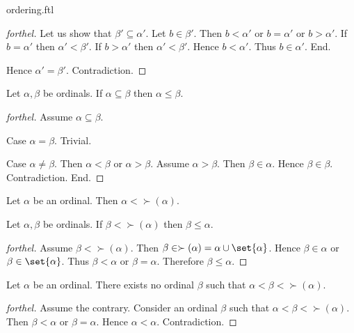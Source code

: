 \documentclass{naproche-library}
\begin{document}
\begin{smodule}{ordering.ftl}
\begin{proof}[forthel]
    Let us show that $\beta' \subseteq \alpha'$.
      Let $b \in \beta'$.
      Then $b < \alpha'$ or $b = \alpha'$ or $b > \alpha'$.
      If $b = \alpha'$ then $\alpha' < \beta'$.
      If $b > \alpha'$ then $\alpha' < \beta'$.
      Hence $b < \alpha'$.
      Thus $b \in \alpha'$.
    End.

    Hence $\alpha' = \beta'$.
    Contradiction.
  \end{proof}

  \begin{proposition}[forthel,id=SET_THEORY_02_610496856195072,printid]
    Let $\alpha, \beta$ be ordinals.
    If $\alpha \subseteq \beta$ then $\alpha \leq \beta$.
  \end{proposition}
  \begin{proof}[forthel]
    Assume $\alpha \subseteq \beta$.

    Case $\alpha = \beta$. Trivial.

    Case $\alpha \neq \beta$.
      Then $\alpha < \beta$ or $\alpha > \beta$.
      Assume $\alpha > \beta$.
      Then $\beta \in \alpha$.
      Hence $\beta \in \beta$.
      Contradiction.
    End.
  \end{proof}

  \begin{proposition}[forthel,id=SET_THEORY_02_5689190964527104,printid]
    Let $\alpha$ be an ordinal.
    Then $\alpha < \succ(\alpha)$.
  \end{proposition}

  \begin{proposition}[forthel,id=SET_THEORY_02_4064972025888768,printid]
    Let $\alpha, \beta$ be ordinals.
    If $\beta < \succ(\alpha)$ then $\beta \leq \alpha$.
  \end{proposition}
  \begin{proof}[forthel]
    Assume $\beta < \succ(\alpha)$.
    Then $\beta \in \succ(\alpha) = \alpha \cup \set{\alpha}$.
    Hence $\beta \in \alpha$ or $\beta \in \set{\alpha}$.
    Thus $\beta < \alpha$ or $\beta = \alpha$.
    Therefore $\beta \leq \alpha$.
  \end{proof}

  \begin{proposition}[forthel,id=SET_THEORY_02_8242798790705152,printid]
    Let $\alpha$ be an ordinal.
    There exists no ordinal $\beta$ such that $\alpha < \beta < \succ(\alpha)$.
  \end{proposition}
  \begin{proof}[forthel]
    Assume the contrary.
    Consider an ordinal $\beta$ such that $\alpha < \beta < \succ(\alpha)$.
    Then $\beta < \alpha$ or $\beta = \alpha$.
    Hence $\alpha < \alpha$.
    Contradiction.
  \end{proof}


\end{smodule}
\end{document}
